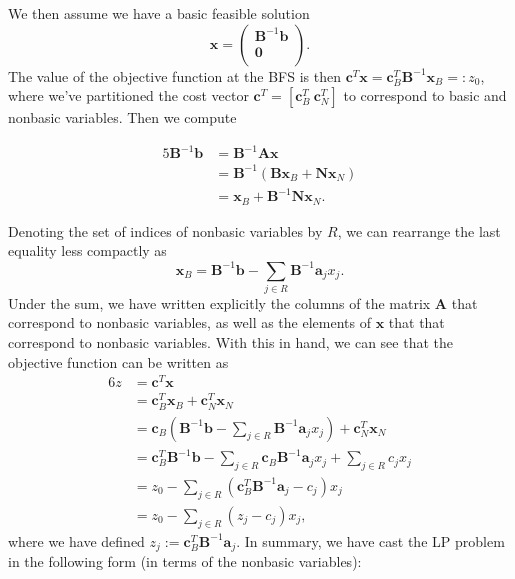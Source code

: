 \documentclass[12pt,english]{article}
\begin{document}
We then assume we have a basic feasible solution 
$$
\mathbf{x} = 
\left(
\begin{array}{c}
\mathbf{B}^{-1}\mathbf{b}  \\
\mathbf{0} \\
\end{array}
\right).
$$
The value of the objective function at the BFS is then $\mathbf{c}^T \mathbf{x} = \mathbf{c}_B^T \mathbf{B}^{-1}\mathbf{x}_B =:z_0$, where we've partitioned the cost vector $\mathbf{c}^T = [ \mathbf{c}_B^T ~\mathbf{c}_N^T]$ to correspond to basic and nonbasic variables.  Then we compute


\begin{alignat*}{5}
\mathbf{B}^{-1} \mathbf{b}  	&= \mathbf{B}^{-1}\mathbf{A}\mathbf{x} \\
						&= \mathbf{B}^{-1}(\mathbf{B}\mathbf{x}_B + \mathbf{N}\mathbf{x}_N) \\
						&= \mathbf{x}_B + \mathbf{B}^{-1} \mathbf{N} \mathbf{x}_N.
\end{alignat*}

Denoting the set of indices of nonbasic variables by $R$, we can rearrange the last equality less compactly as
$$
\mathbf{x}_B = \mathbf{B}^{-1}\mathbf{b} - \sum_{j \in R} \mathbf{B}^{-1} \mathbf{a}_j x_j.
$$
Under the sum, we have written explicitly the columns of the matrix $\mathbf{A}$ that correspond to nonbasic variables, as well as the elements of $\mathbf{x}$ that that correspond to nonbasic variables.  With this in hand, we can see that the objective function can be written as
\begin{alignat*}{6}
z 		&= \mathbf{c}^T \mathbf{x} \\
		&= \mathbf{c}_B^T\mathbf{x}_B + \mathbf{c}_N^T \mathbf{x}_N \\
		&= \mathbf{c}_B \left( \mathbf{B}^{-1} \mathbf{b} - \sum_{j \in R} \mathbf{B}^{-1} \mathbf{a}_j x_j\right) + \mathbf{c}_N^T \mathbf{x}_N \\
		&= \mathbf{c}_B^T \mathbf{B}^{-1}\mathbf{b} - \sum_{j \in R} \mathbf{c}_B \mathbf{B}^{-1} \mathbf{a}_j x_j + \sum_{j \in R} c_j x_j \\
		&= z_0 - \sum_{j \in R} (\mathbf{c}_B^T \mathbf{B}^{-1} \mathbf{a}_j - c_j) x_j \\
		&= z_0 - \sum_{j \in R} (z_j -c_j)x_j, 
\end{alignat*}
where we have defined $z_j := \mathbf{c}_B^T \mathbf{B}^{-1} \mathbf{a}_j $.  In summary, we have cast the LP problem in the following form (in terms of the nonbasic variables):
\end{document}

